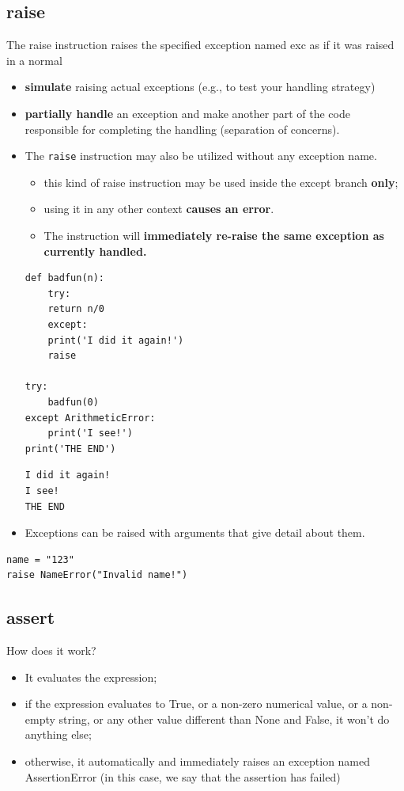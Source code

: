 \documentclass[11pt]{article}
\begin{document}
\subsection{raise}
\label{sec:org762c25b}
The raise instruction raises the specified exception named exc as if
it was raised in a normal
\begin{itemize}
\item \textbf{simulate} raising actual exceptions (e.g., to test your handling
strategy)
\item \textbf{partially handle} an exception and make another part of the code
responsible for completing the handling (separation of concerns).
\item The \texttt{raise} instruction may also be utilized without any exception
name.
\begin{itemize}
\item this kind of raise instruction may be used inside the except
branch \textbf{only};
\item using it in any other context \textbf{causes an error}.
\item The instruction will \textbf{immediately re-raise the same exception as
currently handled.}
\end{itemize}
\begin{verbatim}
def badfun(n):
    try:
	return n/0
    except:
	print('I did it again!')
	raise

try:
    badfun(0)
except ArithmeticError:
    print('I see!')
print('THE END')
\end{verbatim}

\begin{verbatim}
I did it again!
I see!
THE END
\end{verbatim}

\item Exceptions can be raised with arguments that give detail about them.
\end{itemize}

\begin{verbatim}
name = "123"
raise NameError("Invalid name!")
\end{verbatim}

\subsection{assert}
\label{sec:orgce7f38e}
How does it work?
\begin{itemize}
\item It evaluates the expression;
\item if the expression evaluates to True, or a non-zero numerical value,
or a non-empty string, or any other value different than None and
False, it won’t do anything else;
\item otherwise, it automatically and immediately raises an exception
named AssertionError (in this case, we say that the assertion has
failed)
\end{itemize}
\end{document}
